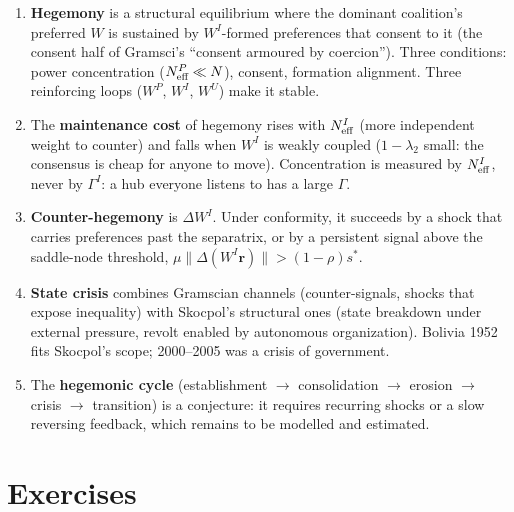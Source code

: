 \documentclass[../structural_economics_book.tex]{subfiles}
\begin{document}
\begin{enumerate}
\item \textbf{Hegemony} is a structural equilibrium where the dominant coalition's preferred $W$ is sustained by $W^I$-formed preferences that consent to it (the consent half of Gramsci's ``consent armoured by coercion''). Three conditions: power concentration ($N_{\text{eff}}^P \ll N$), consent, formation alignment. Three reinforcing loops ($W^P$, $W^I$, $W^U$) make it stable.

\item The \textbf{maintenance cost} of hegemony rises with $N_{\text{eff}}^I$ (more independent weight to counter) and falls when $W^I$ is weakly coupled ($1-\lambda_2$ small: the consensus is cheap for anyone to move). Concentration is measured by $N_{\text{eff}}^I$, never by $\Gamma^I$: a hub everyone listens to has a large $\Gamma$.

\item \textbf{Counter-hegemony} is $\Delta W^I$. Under conformity, it succeeds by a shock that carries preferences past the separatrix, or by a persistent signal above the saddle-node threshold, $\mu\|\Delta(W^I\mathbf{r})\| > (1-\rho)s^*$.

\item \textbf{State crisis} combines Gramscian channels (counter-signals, shocks that expose inequality) with Skocpol's structural ones (state breakdown under external pressure, revolt enabled by autonomous organization). Bolivia 1952 fits Skocpol's scope; 2000--2005 was a crisis of government.

\item The \textbf{hegemonic cycle} (establishment $\to$ consolidation $\to$ erosion $\to$ crisis $\to$ transition) is a conjecture: it requires recurring shocks or a slow reversing feedback, which remains to be modelled and estimated.
\end{enumerate}


\section{Exercises}
\label{ch24:sec:exercises}
\end{document}
